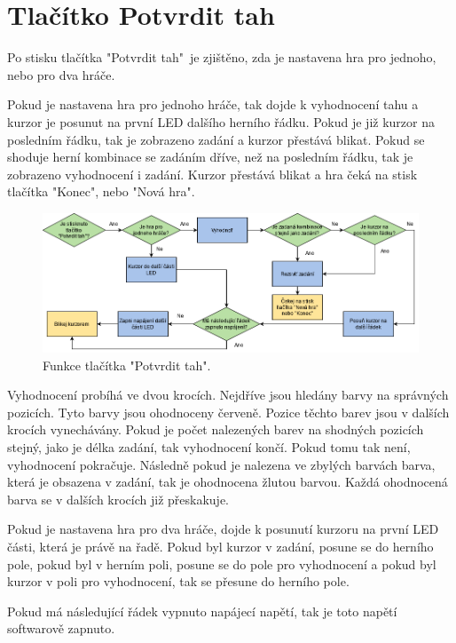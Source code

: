 \section{Tlačítko Potvrdit tah}
Po stisku tlačítka "Potvrdit tah"\  je zjištěno, zda je nastavena hra pro jednoho, nebo pro dva hráče. 

Pokud je nastavena hra pro jednoho hráče, tak dojde k vyhodnocení tahu a kurzor je posunut na první LED dalšího herního řádku. Pokud je již 
kurzor na posledním řádku, tak je zobrazeno zadání a kurzor přestává blikat. Pokud se shoduje herní kombinace se zadáním dříve, než na 
posledním řádku, tak je zobrazeno vyhodnocení i zadání. Kurzor přestává blikat a hra čeká na stisk tlačítka "Konec", nebo "Nová hra". 

\begin{figure}[!h]
    \begin{center}
      \includegraphics[scale=0.5]{obrazky/Enter.png}
    \end{center}
    \caption[Funkce tlačítka Potvrdit tah]{Funkce tlačítka "Potvrdit tah".}
  \end{figure}

Vyhodnocení probíhá ve dvou krocích. Nejdříve jsou hledány barvy na správných pozicích. Tyto barvy jsou ohodnoceny červeně. Pozice těchto 
barev jsou v dalších krocích vynechávány. Pokud je počet nalezených barev na shodných pozicích stejný, jako je délka zadání, tak vyhodnocení 
končí. Pokud tomu tak není, vyhodnocení pokračuje. Následně pokud je nalezena ve zbylých barvách barva, která je obsazena v zadání, tak je 
ohodnocena žlutou barvou. Každá ohodnocená barva se v dalších krocích již přeskakuje. 

Pokud je nastavena hra pro dva hráče, dojde k posunutí kurzoru na první LED části, která je právě na řadě. Pokud byl kurzor v zadání, posune
se do herního pole, pokud byl v herním poli, posune se do pole pro vyhodnocení a pokud byl kurzor v poli pro vyhodnocení, tak se přesune
do herního pole. 

Pokud má následující řádek vypnuto napájecí napětí, tak je toto napětí softwarově zapnuto. 

